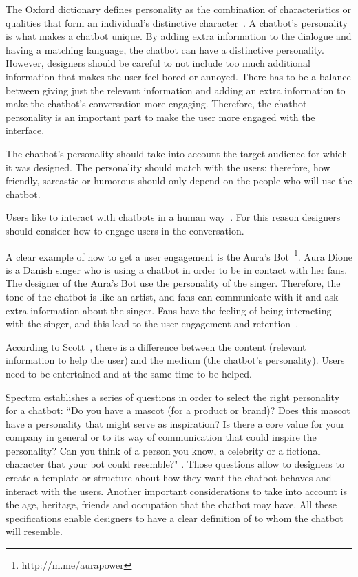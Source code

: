 \documentclass[a4paper,10pt]{article}
\begin{document}
The Oxford dictionary defines personality as the combination of characteristics or qualities that form an individual's distinctive character~\cite{Oxford}. A chatbot’s personality is what makes a chatbot unique. By adding extra information to the dialogue and having a matching language, the chatbot can have a distinctive personality. However, designers should be careful to not include too much additional information that makes the user feel bored or annoyed. There has to be a balance between giving just the relevant information and adding an extra information to make the chatbot's conversation more engaging. Therefore, the chatbot personality is an important part to make the user more engaged with the interface.

The chatbot’s personality should take into account the target audience for which it was designed. The personality should match with the users: therefore, how friendly, sarcastic or humorous should only depend on the people who will use the chatbot. 

Users like to interact with chatbots in a human way~\cite{HeuristicsWebPage}. For this reason designers should consider how to engage users in the conversation. 

A clear example of how to get a user engagement is the Aura's Bot~\footnote{http://m.me/aurapower}. Aura Dione is a Danish singer who is using a chatbot in order to be in contact with her fans. The designer of the Aura's Bot use the personality of the singer. Therefore, the tone of the chatbot is like an artist, and fans can communicate with it and ask extra information about the singer. Fans have the feeling of being interacting with the singer, and this lead to the user engagement and retention~\cite{personality}.  

According to Scott~\cite{HeuristicsWebPage}, there is a difference between the content (relevant information to help the user) and the medium (the chatbot’s personality). Users need to be entertained and at the same time to be helped.      

Spectrm establishes a series of questions in order to select the right personality for a chatbot: ``Do you have a mascot (for a product or brand)? Does this mascot have a personality that might serve as inspiration? Is there a core value for your company in general or to its way of communication that could inspire the personality? Can you think of a person you know, a celebrity or a fictional character that your bot could resemble?" \cite{personality}. Those questions allow to designers to create a template or structure about how they want the chatbot behaves and interact with the users. Another important considerations to take into account is the age, heritage, friends and occupation that the chatbot may have. All these specifications enable designers to have a clear definition of to whom the chatbot will resemble.
\end{document}
